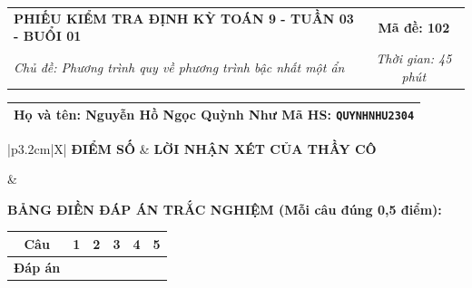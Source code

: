 \documentclass[12pt,a4paper]{article}
\begin{document}
\newpage


\noindent
\begin{tabularx}{\linewidth}{|X|c|}
\hline
\textbf{PHIẾU KIỂM TRA ĐỊNH KỲ TOÁN 9 - TUẦN 03 - BUỔI 01} & \textbf{Mã đề: 102} \\
\textit{Chủ đề: Phương trình quy về phương trình bậc nhất một ẩn} & \textit{Thời gian: 45 phút} \\
\hline
\end{tabularx}

\vspace{1mm}

\noindent
\begin{tabularx}{\linewidth}{|X|}
\hline
\rule[-2mm]{0pt}{7.5mm}\textbf{Họ và tên:} \textbf{\large Nguyễn Hồ Ngọc Quỳnh Như} \hfill \textbf{Mã HS:} \texttt{QUYNHNHU2304} \quad \\
\hline
\end{tabularx}

\vspace{1mm}

\noindent
\begin{tabularx}{\linewidth}{|p{3.2cm}|X|}
\hline
\centering\textbf{ĐIỂM SỐ} & \centering\textbf{LỜI NHẬN XÉT CỦA THẦY CÔ} \tabularnewline
\hline
\rule{0pt}{1.3cm} & \tabularnewline
\hline
\end{tabularx}

\vspace{1.2mm}

\noindent\textbf{BẢNG ĐIỀN ĐÁP ÁN TRẮC NGHIỆM (Mỗi câu đúng 0,5 điểm):}
\vspace{0.8mm}

\noindent
\renewcommand{\arraystretch}{1.35}
\begin{tabularx}{\linewidth}{|c|*{5}{>{\centering\arraybackslash}X|}}
\hline
\textbf{Câu} & \textbf{1} & \textbf{2} & \textbf{3} & \textbf{4} & \textbf{5} \\
\hline
\textbf{Đáp án} & & & & & \\
\hline
\end{tabularx}
\renewcommand{\arraystretch}{1.0}

\vspace{1.5mm}
\end{document}

